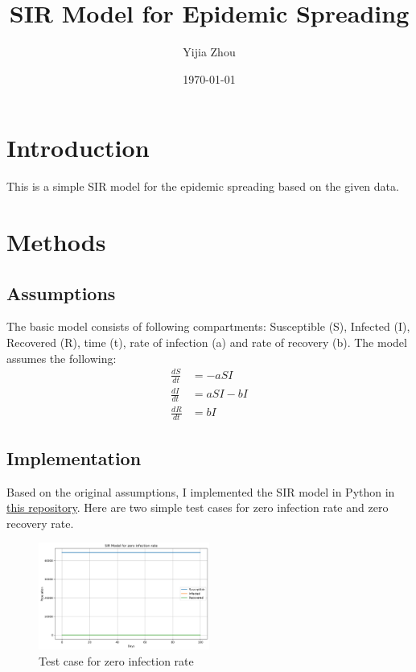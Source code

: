 \documentclass[11pt]{article}
\title{SIR Model for Epidemic Spreading}
\author{Yijia Zhou}
\date{\today}
\begin{document}
\maketitle


\section{Introduction}
This is a simple SIR model for the epidemic spreading based on the given data.

\section{Methods}
\subsection{Assumptions}
The basic model consists of following compartments: Susceptible (S), Infected (I), Recovered (R), time (t), rate of infection (a) and rate of recovery (b). The model assumes the following:
$$
\begin{aligned}
    \frac{dS}{dt} & = -aSI \\
    \frac{dI}{dt} & = aSI - bI \\
    \frac{dR}{dt} & = bI
\end{aligned}
$$

\subsection{Implementation}
Based on the original assumptions, I implemented the SIR model in Python in \href{https://github.com/yijiazho/data-analysis-hu/blob/main/sir/model.py}{this repository}. Here are two simple test cases for zero infection rate and zero recovery rate.

\begin{figure}[H]
    \centering
    \includegraphics[width=0.5\textwidth]{zero_infection}
    \caption{Test case for zero infection rate}
    \label{zero_infection}
\end{figure}
\end{document}
